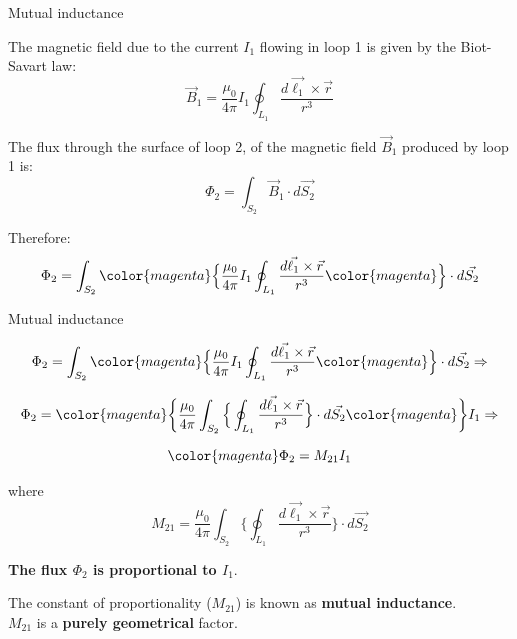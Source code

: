 %
%
%

\begin{frame}{Mutual inductance}


The magnetic field due to the current $I_1$ flowing in loop 1 is given by the Biot-Savart law:
\begin{equation*}
  \vec{B}_1 = \frac{\mu_0}{4\pi} I_1 \oint_{L_1} \frac{d\vec{\ell_1} \times \vec{r}}{r^3}
\end{equation*}

The flux through the surface of loop 2, of the magnetic field $\vec{B}_1$ produced by loop 1 is:
\begin{equation*}
  \Phi_2 = \int_{S_2} \vec{B}_1 \cdot d\vec{S_2}
\end{equation*}

Therefore:
\begin{equation*}
  \Phi_2 = \int_{S_2}
      {\color{magenta} \Big\{ }
        \frac{\mu_0}{4\pi} I_1 \oint_{L_1} \frac{d\vec{\ell_1} \times \vec{r}}{r^3}
      {\color{magenta} \Big\} } \cdot d\vec{S_2}
\end{equation*}

\end{frame}

%
%
%

\begin{frame}{Mutual inductance}

\begin{equation*}
  \Phi_2 = \int_{S_2}
      {\color{magenta} \Big\{ }
        \frac{\mu_0}{4\pi} I_1 \oint_{L_1} \frac{d\vec{\ell_1} \times \vec{r}}{r^3}
      {\color{magenta} \Big\} } \cdot d\vec{S_2} \Rightarrow
\end{equation*}

\begin{equation*}
  \Phi_2 = {\color{magenta}\bigg\{ }
                   \frac{\mu_0}{4\pi} \int_{S_2} \Big\{ \oint_{L_1} \frac{d\vec{\ell_1} \times \vec{r}}{r^3} \Big\} \cdot d\vec{S_2}
                 {\color{magenta}\bigg\} }  I_1 \Rightarrow
\end{equation*}

\begin{equation*}
   {\color{magenta} \Phi_2 = M_{21}  I_1 }
\end{equation*}

where
\begin{equation*}
  M_{21}  =  \frac{\mu_0}{4\pi} \int_{S_2} \Big\{ \oint_{L_1} \frac{d\vec{\ell_1} \times \vec{r}}{r^3} \Big\} \cdot d\vec{S_2}
\end{equation*}

\vspace{0.3cm}

{\bf The flux $\Phi_2$ is proportional to $I_1$}.\\
\vspace{0.2cm}

The constant of proportionality ($M_{21}$) is known as {\bf mutual inductance}.\\
$M_{21}$  is a {\bf purely geometrical} factor.

\end{frame}

